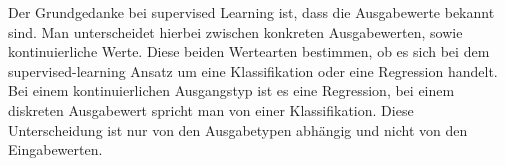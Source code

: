Der Grundgedanke bei supervised Learning ist, dass die Ausgabewerte bekannt
sind. Man unterscheidet hierbei zwischen konkreten Ausgabewerten, sowie
kontinuierliche Werte. Diese beiden Wertearten bestimmen, ob es sich bei dem
supervised-learning Ansatz um eine Klassifikation oder eine Regression handelt.
Bei einem kontinuierlichen Ausgangstyp ist es eine Regression, bei einem
diskreten Ausgabewert spricht man von einer Klassifikation. Diese
Unterscheidung ist nur von den Ausgabetypen abhängig und nicht von den
Eingabewerten.\cite{matzka2021unuberwachtes}\\
